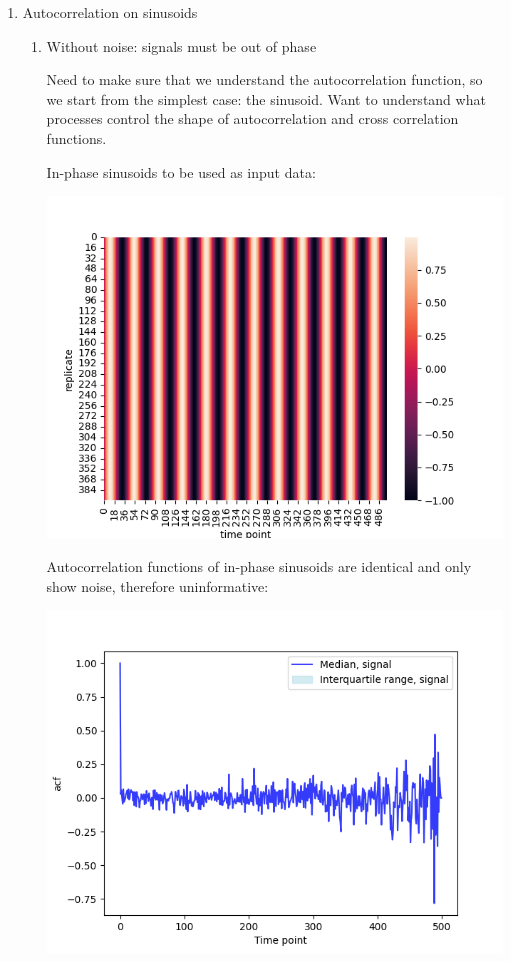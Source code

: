 \begin{enumerate}
\item Autocorrelation on sinusoids
\label{sec:org2fe8e39}

\begin{enumerate}
\item Without noise: signals must be out of phase
\label{sec:orgeef3284}

Need to make sure that we understand the autocorrelation function, so we start from the simplest case: the sinusoid.  Want to understand what processes control the shape of autocorrelation and cross correlation functions.

In-phase sinusoids to be used as input data:
\begin{center}
\includegraphics[width=.9\linewidth]{sinusoids_inphase.png}
\end{center}

Autocorrelation functions of in-phase sinusoids are identical and only show noise, therefore uninformative:
\begin{center}
\includegraphics[width=.9\linewidth]{sinusoids_inphase_acf.png}
\end{center}


\end{enumerate}
\end{enumerate}
